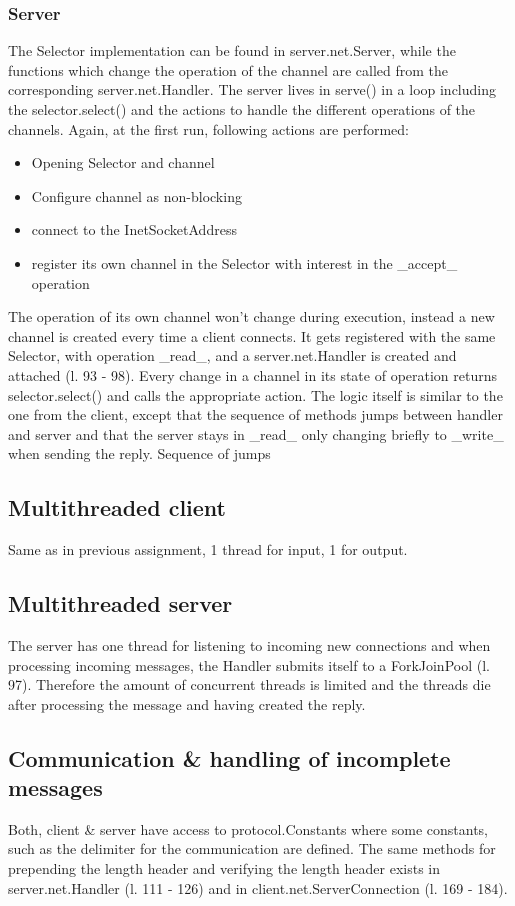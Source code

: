 \documentclass[a4paper]{scrartcl}
\begin{document}
\subsubsection{Server}

The Selector implementation can be found in server.net.Server, while the functions which change the operation of the channel are called from the corresponding server.net.Handler.
The server lives in serve() in a loop including the selector.select() and the actions to handle the different operations of the channels.
Again, at the first run, following actions are performed:
\begin{itemize}
        \item Opening Selector and channel
        \item Configure channel as non-blocking
        \item connect to the InetSocketAddress
        \item register its own channel in the Selector with interest in the _accept_ operation
\end{itemize}
The operation of its own channel won't change during execution, instead a new channel is created every time a client connects.
It gets registered with the same Selector, with operation _read_, and a server.net.Handler is created and attached (l. 93 - 98).
Every change in a channel in its state of operation returns selector.select() and calls the appropriate action.
The logic itself is similar to the one from the client, except that the sequence of methods jumps between handler and server and that the server stays in _read_ only changing briefly to _write_ when sending the reply.
Sequence of jumps


\subsection{Multithreaded client}
Same as in previous assignment, 1 thread for input, 1 for output.


\subsection{Multithreaded server}
The server has one thread for listening to incoming new connections and when processing incoming messages, the Handler submits itself to a ForkJoinPool (l. 97).
Therefore the amount of concurrent threads is limited and the threads die after processing the message and having created the reply.


\subsection{Communication & handling of incomplete messages}
Both, client \& server have access to protocol.Constants where some constants, such as the delimiter for the communication are defined.
The same methods for prepending the length header and verifying the length header exists in server.net.Handler (l. 111 - 126) and in client.net.ServerConnection (l. 169 - 184).
\end{document}

